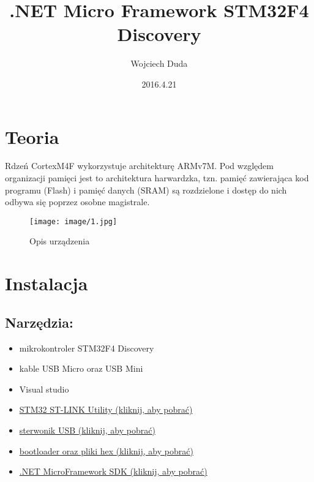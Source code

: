 \documentclass{article}
\title{.NET Micro Framework
STM32F4 Discovery}
\date{2016.4.21}
\author{Wojciech Duda}
\begin{document}
 
\maketitle 
{} 
\newpage
{}
\tableofcontents
\newpage
\section{Teoria}
Rdzeń CortexM4F wykorzystuje architekturę ARMv7M. Pod względem organizacji pamięci jest to architektura harwardzka, tzn. pamięć zawierająca kod programu (Flash) i pamięć danych (SRAM) są rozdzielone i dostęp do nich odbywa się poprzez osobne magistrale.

\begin{figure}[H]
\texttt{[image: image/1.jpg]}
\caption{Opis urządzenia}
\end{figure}
\section{Instalacja}
\subsection{Narzędzia:}
\begin{itemize}
\item mikrokontroler STM32F4 Discovery
\item kable USB Micro oraz USB Mini
\item Visual studio
\item \href{http://www.st.com/content/st_com/en/products/embedded-software/development-tool-software/stsw-link004.html}{STM32 ST-LINK Utility (kliknij, aby pobrać)}
\item \href{http://www.codeplex.com/Download?ProjectName=netmf4stm32&DownloadId=471395}{sterwonik USB (kliknij, aby pobrać)}
\item \href{http://www.codeplex.com/Download?ProjectName=netmf4stm32&DownloadId=471396}{bootloader oraz pliki hex (kliknij, aby pobrać)}
\item \href {http://www.netmf.codeplex.com/releases/view/91594}{.NET MicroFramework SDK (kliknij, aby pobrać)}
\end{itemize}
\end{document}
